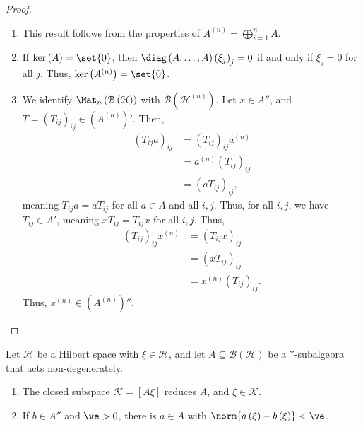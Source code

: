 \documentclass[10pt]{mypackage}
\begin{document}
\begin{proof}\hfill
  \begin{enumerate}[(1)]
    \item This result follows from the properties of $A^{(n)} = \bigoplus_{i=1}^{n}A$.
    \item If $\ker\left(A\right) = \set{0}$, then $ \diag\left(A,\dots,A\right)\left(\xi_j\right)_j = 0$ if and only if $\xi_j = 0$ for all $j$. Thus, $\ker\left(A^{(n)}\right) = \set{0}$.
    \item We identify $\Mat_{n}\left(\mathcal{B}\left(\mathcal{H}\right)\right)$ with $\mathcal{B}\left(\mathcal{H}^{(n)}\right)$. Let $x\in A''$, and $T = \left(T_{ij}\right)_{ij}\in \left(A^{(n)}\right)'$. Then,
      \begin{align*}
        \left(T_{ij}a\right)_{ij} &= \left(T_{ij}\right)_{ij}a^{(n)}\\
                                               &= a^{(n)}\left(T_{ij}\right)_{ij}\\
                                               &= \left(aT_{ij}\right)_{ij},
      \end{align*}
      meaning $T_{ij}a = aT_{ij}$ for all $a\in A$ and all $i,j$. Thus, for all $i,j$, we have $T_{ij}\in A'$, meaning $xT_{ij} = T_{ij}x$ for all $i,j$. Thus,
      \begin{align*}
        \left(T_{ij}\right)_{ij}x^{(n)} &= \left(T_{ij}x\right)_{ij}\\
                                        &= \left(xT_{ij}\right)_{ij}\\
                                        &= x^{(n)}\left(T_{ij}\right)_{ij}.
      \end{align*}
      Thus, $x^{(n)}\in \left(A^{(n)}\right)''$.
  \end{enumerate}
\end{proof}
\begin{lemma}
  Let $\mathcal{H}$ be a Hilbert space with $\xi\in \mathcal{H}$, and let $A\subseteq \mathcal{B}\left(\mathcal{H}\right)$ be a $\ast$-subalgebra that acts non-degenerately.
  \begin{enumerate}[(1)]
    \item The closed subspace $\mathcal{K} = \left[A\xi\right]$ reduces $A$, and $\xi\in \mathcal{K}$.
    \item If $b\in A''$ and $\ve > 0$, there is $a\in A$ with $\norm{a\left(\xi\right) - b\left(\xi\right)} < \ve$.
  \end{enumerate}
\end{lemma}
\end{document}
